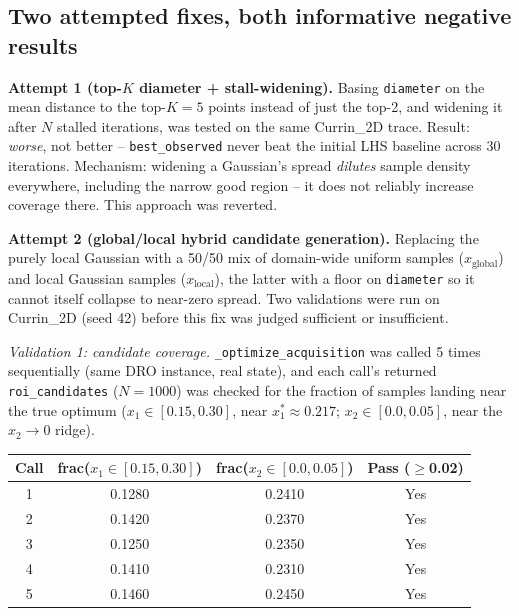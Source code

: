 \documentclass[11pt]{article}
\begin{document}
\subsection{Two attempted fixes, both informative negative results}

\textbf{Attempt 1 (top-$K$ diameter + stall-widening).} Basing \texttt{diameter}
on the mean distance to the top-$K{=}5$ points instead of just the top-2, and
widening it after $N$ stalled iterations, was tested on the same Currin\_2D
trace. Result: \emph{worse}, not better -- \texttt{best\_observed} never beat
the initial LHS baseline across 30 iterations. Mechanism: widening a Gaussian's
spread \emph{dilutes} sample density everywhere, including the narrow good
region -- it does not reliably increase coverage there. This approach was
reverted.

\textbf{Attempt 2 (global/local hybrid candidate generation).} Replacing the
purely local Gaussian with a 50/50 mix of domain-wide uniform samples
($x_{\text{global}}$) and local Gaussian samples ($x_{\text{local}}$), the
latter with a floor on \texttt{diameter} so it cannot itself collapse to
near-zero spread. Two validations were run on Currin\_2D (seed 42) before this
fix was judged sufficient or insufficient.

\textit{Validation 1: candidate coverage.} \texttt{\_optimize\_acquisition} was
called 5 times sequentially (same DRO instance, real state), and each call's
returned \texttt{roi\_candidates} ($N=1000$) was checked for the fraction of
samples landing near the true optimum ($x_1 \in [0.15, 0.30]$, near
$x_1^*\approx0.217$; $x_2 \in [0.0, 0.05]$, near the $x_2\to0$ ridge).

\begin{center}
\begin{tabular}{cccc}
\toprule
\textbf{Call} & \textbf{frac($x_1\in[0.15,0.30]$)} & \textbf{frac($x_2\in[0.0,0.05]$)} & \textbf{Pass ($\geq$0.02)} \\
\midrule
1 & 0.1280 & 0.2410 & Yes \\
2 & 0.1420 & 0.2370 & Yes \\
3 & 0.1250 & 0.2350 & Yes \\
4 & 0.1410 & 0.2310 & Yes \\
5 & 0.1460 & 0.2450 & Yes \\
\bottomrule
\end{tabular}
\end{center}
\end{document}
